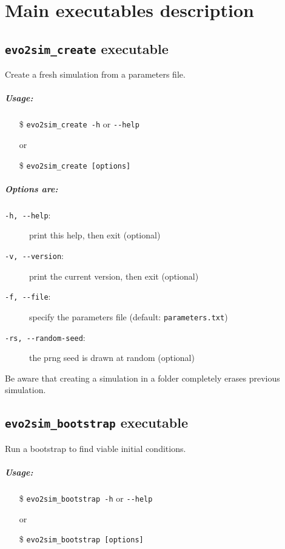 \chapter{Main executables description}

\section{\texttt{evo2sim\_create} executable}
Create a fresh simulation from a parameters file.
\paragraph{Usage:}
\begin{itemize}
        \item[\$] \texttt{evo2sim\_create -h} or \texttt{-{}-help}
        \item[or]
        \item[\$] \texttt{evo2sim\_create [options]}
\end{itemize}
\paragraph{Options are:}
\begin{description}
        \item[\texttt{-h, -{}-help}:] print this help, then exit (optional)
        \item[\texttt{-v, -{}-version}:] print the current version, then exit (optional)
        \item[\texttt{-f, -{}-file}:] specify the parameters file (default: \texttt{parameters.txt})
        \item[\texttt{-rs, -{}-random-seed}:] the prng seed is drawn at random (optional)
\end{description}
Be aware that creating a simulation in a folder completely erases previous simulation.

\section{\texttt{evo2sim\_bootstrap} executable}
Run a bootstrap to find viable initial conditions.
\paragraph{Usage:}
\begin{itemize}
        \item[\$] \texttt{evo2sim\_bootstrap -h} or \texttt{-{}-help}
        \item[or]
        \item[\$] \texttt{evo2sim\_bootstrap [options]}
\end{itemize}
